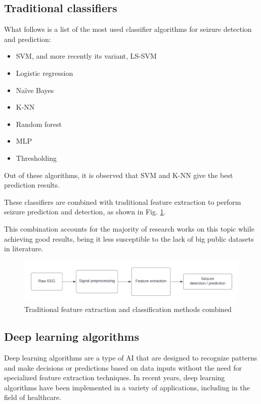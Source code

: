 \subsection{Traditional classifiers}

What follows is a list of the most used classifier algorithms for seizure detection and prediction:

\begin{itemize}
    \item \gls{SVM}, and more recently its variant, \gls{LS-SVM} 
    \item Logistic regression 
    \item Naïve Bayes 
    \item \gls{K-NN} 
    \item Random forest
    \item \gls{MLP}
    \item Thresholding
\end{itemize}

Out of these algorithms, it is observed that \gls{SVM} and \gls{K-NN} give the best prediction results.

These classifiers are combined with traditional feature extraction to perform seizure prediction and detection, as shown in Fig. \ref{fig:traditional-feature-extraction-classification}.

This combination accounts for the majority of research works on this topic while achieving good results, being it less susceptible to the lack of big public datasets in literature.

\begin{figure}[ht]
    \centering
    \includegraphics[width=1.0\textwidth]{images/State-of-art/traditional-feature-extraction-classification.png}
    \caption{Traditional feature extraction and classification methods combined}
    \label{fig:traditional-feature-extraction-classification}
\end{figure}

\subsection{Deep learning algorithms}
Deep learning algorithms are a type of \gls{AI} that are designed to recognize patterns and make decisions or predictions based on data inputs without the need for specialized feature extraction techniques. In recent years, deep learning algorithms have been implemented in a variety of applications, including in the field of healthcare. 

